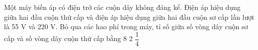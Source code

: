 \begin{vidu} %
	Một máy biến áp có điện trở các cuộn dây không đáng kể. Điện áp hiệu dụng giữa hai đầu cuộn thứ cấp và điện áp hiệu dụng giữa hai đầu cuộn sơ cấp lần lượt là 55 V và 220 V. Bỏ qua các hao phí trong máy, tỉ số giữa số vòng dây cuộn sơ cấp và số vòng dây cuộn thứ cấp bằng
	\choice
	{8}
	{}
	{2}
	{$\dfrac{1}{4}$}
\end{vidu}

